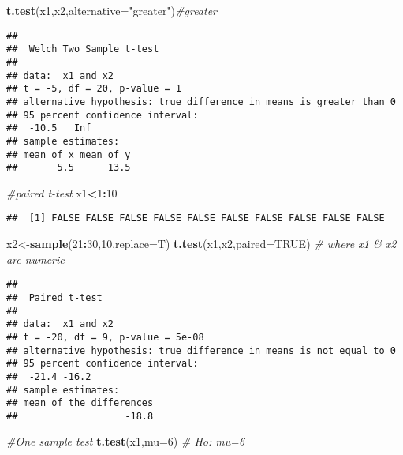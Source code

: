 \documentclass[]{book}
\newenvironment{Shaded}{\begin{snugshade}}{\end{snugshade}}
\newcommand{\KeywordTok}[1]{\textcolor[rgb]{0.13,0.29,0.53}{\textbf{#1}}}
\newcommand{\DataTypeTok}[1]{\textcolor[rgb]{0.13,0.29,0.53}{#1}}
\newcommand{\DecValTok}[1]{\textcolor[rgb]{0.00,0.00,0.81}{#1}}
\newcommand{\StringTok}[1]{\textcolor[rgb]{0.31,0.60,0.02}{#1}}
\newcommand{\CommentTok}[1]{\textcolor[rgb]{0.56,0.35,0.01}{\textit{#1}}}
\newcommand{\OtherTok}[1]{\textcolor[rgb]{0.56,0.35,0.01}{#1}}
\newcommand{\OperatorTok}[1]{\textcolor[rgb]{0.81,0.36,0.00}{\textbf{#1}}}
\newcommand{\NormalTok}[1]{#1}
\theoremstyle{definition}
\theoremstyle{definition}
\theoremstyle{definition}
\theoremstyle{remark}
\begin{document}
\begin{Shaded}
\begin{Highlighting}[]
\KeywordTok{t.test}\NormalTok{(x1,x2,}\DataTypeTok{alternative=}\StringTok{"greater"}\NormalTok{)}\CommentTok{#greater}
\end{Highlighting}
\end{Shaded}

\begin{verbatim}
## 
##  Welch Two Sample t-test
## 
## data:  x1 and x2
## t = -5, df = 20, p-value = 1
## alternative hypothesis: true difference in means is greater than 0
## 95 percent confidence interval:
##  -10.5   Inf
## sample estimates:
## mean of x mean of y 
##       5.5      13.5
\end{verbatim}

\begin{Shaded}
\begin{Highlighting}[]
\CommentTok{#paired t-test}
\NormalTok{x1}\OperatorTok{<}\DecValTok{1}\OperatorTok{:}\DecValTok{10}
\end{Highlighting}
\end{Shaded}

\begin{verbatim}
##  [1] FALSE FALSE FALSE FALSE FALSE FALSE FALSE FALSE FALSE FALSE
\end{verbatim}

\begin{Shaded}
\begin{Highlighting}[]
\NormalTok{x2<-}\KeywordTok{sample}\NormalTok{(}\DecValTok{21}\OperatorTok{:}\DecValTok{30}\NormalTok{,}\DecValTok{10}\NormalTok{,}\DataTypeTok{replace=}\NormalTok{T)}
\KeywordTok{t.test}\NormalTok{(x1,x2,}\DataTypeTok{paired=}\OtherTok{TRUE}\NormalTok{) }\CommentTok{# where x1 & x2 are numeric}
\end{Highlighting}
\end{Shaded}

\begin{verbatim}
## 
##  Paired t-test
## 
## data:  x1 and x2
## t = -20, df = 9, p-value = 5e-08
## alternative hypothesis: true difference in means is not equal to 0
## 95 percent confidence interval:
##  -21.4 -16.2
## sample estimates:
## mean of the differences 
##                   -18.8
\end{verbatim}

\begin{Shaded}
\begin{Highlighting}[]
\CommentTok{#One sample test}
\KeywordTok{t.test}\NormalTok{(x1,}\DataTypeTok{mu=}\DecValTok{6}\NormalTok{) }\CommentTok{# Ho: mu=6}
\end{Highlighting}
\end{Shaded}
\end{document}
